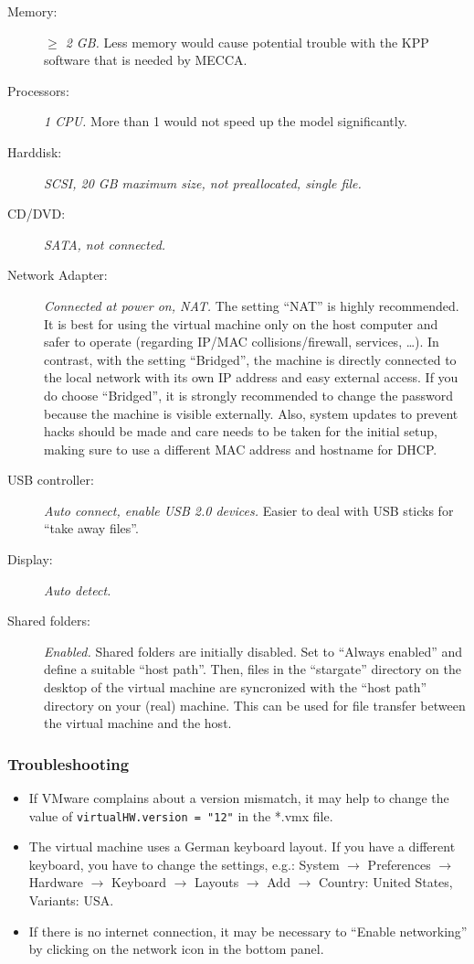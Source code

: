 \documentclass[a4paper,twoside]{article}
\begin{document}
\begin{description}
\item[Memory:] {\em $\geq$ 2 GB.} Less memory would cause potential trouble
  with the KPP software that is needed by MECCA.
\item[Processors:] {\em 1 CPU.} More than 1 would not speed up the model
  significantly.
\item[Harddisk:] {\em SCSI, 20 GB maximum size, not preallocated, single
    file.}
\item[CD/DVD:] {\em SATA, not connected.}
\item[Network Adapter:] {\em Connected at power on, NAT.} The setting
  ``NAT'' is highly recommended. It is best for using the virtual
  machine only on the host computer and safer to operate (regarding
  IP/MAC collisions/firewall, services, \dots). In contrast, with the
  setting ``Bridged'', the machine is directly connected to the local
  network with its own IP address and easy external access. If you do
  choose ``Bridged'', it is strongly recommended to change the password
  because the machine is visible externally. Also, system updates to
  prevent hacks should be made and care needs to be taken for the
  initial setup, making sure to use a different MAC address and hostname
  for DHCP.
\item[USB controller:] {\em Auto connect, enable USB 2.0 devices.}
  Easier to deal with USB sticks for ``take away files''.
\item[Display:] {\em Auto detect.}
\item[Shared folders:] {\em Enabled.} Shared folders are initially
  disabled. Set to ``Always enabled'' and define a suitable ``host
  path''. Then, files in the ``stargate'' directory on the desktop of
  the virtual machine are syncronized with the ``host path'' directory
  on your (real) machine. This can be used for file transfer between the
  virtual machine and the host.
\end{description}

\subsubsection{Troubleshooting}

\begin{itemize}
\item If VMware complains about a version mismatch, it may help to
  change the value of \verb|virtualHW.version = "12"| in the *.vmx file.
\item The virtual machine uses a German keyboard layout. If you have a
  different keyboard, you have to change the settings, e.g.: System
  $\rightarrow$ Preferences $\rightarrow$ Hardware $\rightarrow$
  Keyboard $\rightarrow$ Layouts $\rightarrow$ Add $\rightarrow$
  Country: United States, Variants: USA.
\item If there is no internet connection, it may be necessary to
  ``Enable networking'' by clicking on the network icon in the bottom
  panel.
\end{itemize}
\end{document}
